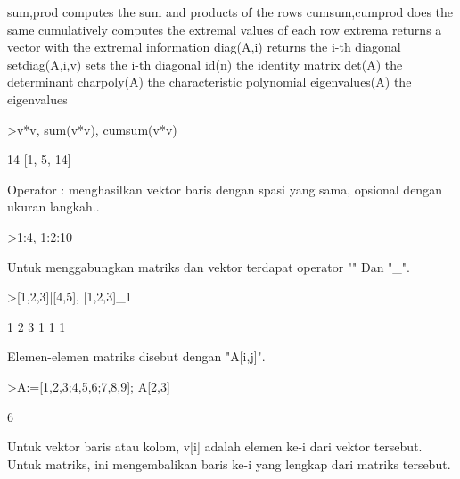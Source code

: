 \documentclass{article}
\begin{document}
\begin{eulernotebook}
\begin{eulercomment}
\begin{eulercomment}
\begin{eulercomment}
\begin{eulercomment}
\begin{eulercomment}
\begin{eulercomment}
\begin{eulercomment}
\end{eulercomment}
\begin{eulerttcomment}
  sum,prod computes the sum and products of the rows
  cumsum,cumprod does the same cumulatively
  computes the extremal values of each row
  extrema returns a vector with the extremal information
  diag(A,i) returns the i-th diagonal
  setdiag(A,i,v) sets the i-th diagonal
  id(n) the identity matrix
  det(A) the determinant
  charpoly(A) the characteristic polynomial
  eigenvalues(A) the eigenvalues
\end{eulerttcomment}
\begin{eulerprompt}
>v*v, sum(v*v), cumsum(v*v)
\end{eulerprompt}
\begin{euleroutput}
  [1,  4,  9]
  14
  [1,  5,  14]
\end{euleroutput}
\begin{eulercomment}
Operator : menghasilkan vektor baris dengan spasi yang sama, opsional
dengan ukuran langkah..
\end{eulercomment}
\begin{eulerprompt}
>1:4, 1:2:10
\end{eulerprompt}
\begin{euleroutput}
  [1,  2,  3,  4]
  [1,  3,  5,  7,  9]
\end{euleroutput}
\begin{eulercomment}
Untuk menggabungkan matriks dan vektor terdapat operator "\textbar{}" Dan "\_".
\end{eulercomment}
\begin{eulerprompt}
>[1,2,3]|[4,5], [1,2,3]_1
\end{eulerprompt}
\begin{euleroutput}
  [1,  2,  3,  4,  5]
              1             2             3 
              1             1             1 
\end{euleroutput}
\begin{eulercomment}
Elemen-elemen matriks disebut dengan "A[i,j]".
\end{eulercomment}
\begin{eulerprompt}
>A:=[1,2,3;4,5,6;7,8,9]; A[2,3]
\end{eulerprompt}
\begin{euleroutput}
  6
\end{euleroutput}
\begin{eulercomment}
Untuk vektor baris atau kolom, v[i] adalah elemen ke-i dari vektor
tersebut. Untuk matriks, ini mengembalikan baris ke-i yang lengkap
dari matriks tersebut.

\end{eulercomment}
\end{eulercomment}
\end{eulercomment}
\end{eulercomment}
\end{eulercomment}
\end{eulercomment}
\end{eulercomment}
\end{eulernotebook}
\end{document}
